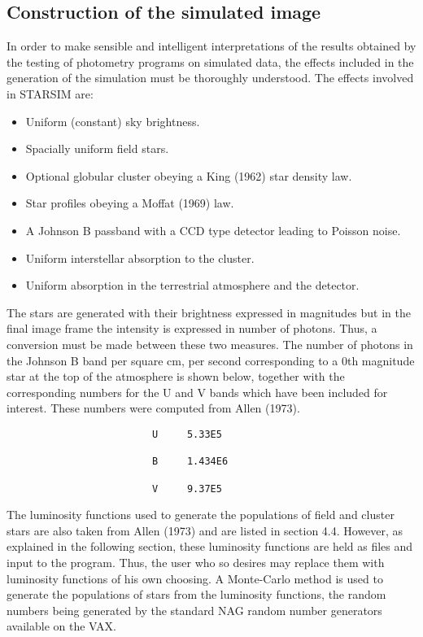 \subsection {Construction of the simulated image}
In order to make sensible and intelligent interpretations of the results
obtained by the testing of photometry programs on simulated data, the effects
included in the generation of the simulation must be thoroughly understood.
The effects involved in STARSIM are:
\begin{itemize}
\item Uniform (constant) sky brightness.
\item Spacially uniform field stars.
\item Optional globular cluster obeying a King (1962) star density law.
\item Star profiles obeying a Moffat (1969) law.
\item A Johnson B passband with a CCD type detector leading to Poisson noise.
\item Uniform interstellar absorption to the cluster.
\item Uniform absorption in the terrestrial atmosphere and the detector.
\end{itemize}
The stars are generated with their brightness expressed in magnitudes but in
the final image frame the intensity is expressed in number of photons.
Thus, a conversion must be made between these two measures.
The number of photons in the Johnson B band per square cm, per second
corresponding to a 0th magnitude star at the top of the atmosphere is shown
below, together with the corresponding numbers for the U and V bands which have
been included for interest.
These numbers were computed from Allen (1973).
\begin{verbatim}
                         U     5.33E5

                         B     1.434E6

                         V     9.37E5
\end{verbatim}
The luminosity functions used to generate the populations of field and cluster
stars are also taken from Allen (1973) and are listed in section 4.4.
However, as explained in the following section, these luminosity functions are
held as files and input to the program.
Thus, the user who so desires may replace them with luminosity functions of his
own choosing.
A Monte-Carlo method is used to generate the populations of stars from the
luminosity functions, the random numbers being generated by the standard NAG
random number generators available on the VAX.

